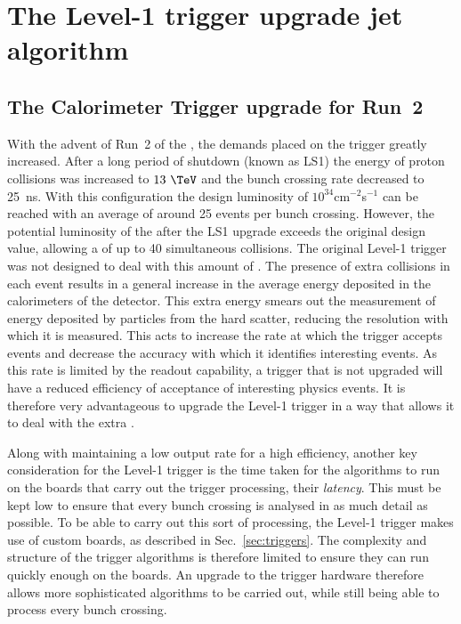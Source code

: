 \chapter{The Level-1 trigger upgrade jet algorithm}
\label{chap:l1trig}

\section{The Calorimeter Trigger upgrade for Run~2}
\label{sec:trigUpgrade}

With the advent of Run~2 of the \LHC, the demands placed on the \CMS
trigger greatly increased. After a long period of shutdown (known as
\ac{LS1}) the energy
of proton collisions was increased to $13~\tev$ and the bunch crossing
rate decreased to 25~ns. With this configuration the design luminosity
of $10^{34}$cm$^{-2}$s$^{-1}$ can be reached with an average \PU of
around 25 events per bunch crossing. However, the potential luminosity
of the \LHC after the \ac{LS1} upgrade exceeds the original design
value, allowing a \PU of up to 40 simultaneous collisions. The
original Level-1 trigger was not designed to deal with this amount of
\PU. The presence of extra collisions in each event results in a
general increase in the average energy deposited in the calorimeters
of the detector. This extra energy smears out the measurement of
energy deposited by particles from the hard scatter, reducing the
resolution with which it is measured. This acts to increase the rate
at which the trigger accepts events and decrease the accuracy with
which it identifies interesting events. As this rate is limited by the
readout capability, a trigger that is not upgraded will have a reduced
efficiency of acceptance of interesting physics events.  It is
therefore very advantageous to upgrade the Level-1 trigger in a way
that allows it to deal with the extra \PU \cite{Tapper:1556311}.

Along with maintaining a low output rate for a high efficiency,
another key consideration for the Level-1 trigger is the time taken
for
the algorithms to run on the boards that carry out the trigger
processing, their \emph{latency}. This must be kept low to ensure that
every bunch
crossing is analysed in as much detail as possible. To be able to
carry out this sort of processing, the Level-1 trigger makes use of custom
\FPGA boards, as described in Sec.~\ref{sec:triggers}. The complexity
and structure of the trigger algorithms is therefore limited to ensure
they can run quickly enough on the \FPGA boards. An upgrade to the
trigger hardware therefore allows more sophisticated algorithms to be
carried out, while still being able to process every bunch crossing.

